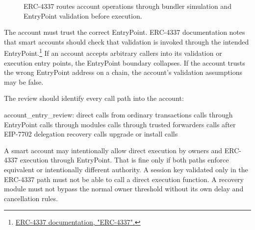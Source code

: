 \begin{figure}[htbp]
\centering
{}
\caption{ERC-4337 routes account operations through bundler simulation and EntryPoint validation before execution.}
\end{figure}

The account must trust the correct EntryPoint. ERC-4337 documentation notes that smart accounts should check that validation is invoked through the intended EntryPoint.\footnote{\href{https://docs.erc4337.io/core-standards/erc-4337.html}{ERC-4337 documentation, "ERC-4337".}} If an account accepts arbitrary callers into its validation or execution entry points, the EntryPoint boundary collapses. If the account trusts the wrong EntryPoint address on a chain, the account's validation assumptions may be false.

The review should identify every call path into the account:

\begin{codeblock}
account_entry_review:
    direct calls from ordinary transactions
    calls through EntryPoint
    calls through modules
    calls through trusted forwarders
    calls after EIP-7702 delegation
    recovery calls
    upgrade or install calls
\end{codeblock}

A smart account may intentionally allow direct execution by owners and ERC-4337 execution through EntryPoint. That is fine only if both paths enforce equivalent or intentionally different authority. A session key validated only in the ERC-4337 path must not be able to call a direct execution function. A recovery module must not bypass the normal owner threshold without its own delay and cancellation rules.

